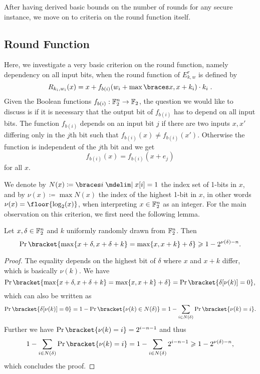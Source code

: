 After having derived basic bounds on the number of rounds for any secure instance, we move on to criteria on the round function itself.

\subsection{Round Function}
Here, we investigate a very basic criterion on the round function, namely dependency on all input bits, when the round function of $E^r_{k,w}$ is defined by
\begin{equation*}
    R_{k_i,w_i}(x) = x + f_{b(i)}(w_i + \max\set{x, x + k_i}) \cdot k_i\;.
\end{equation*}
Given the Boolean functions $f_{b(i)}:\mathbb{F}_2^n \to \mathbb{F}_2$, the question we would like to discuss is if it is necessary that the output bit of $f_{b(i)}$ has to depend on all input bits.
The function $f_{b(i)}$ depends on an input bit $j$ if there are two inputs $x,x'$ differing only in the $j$th bit such that $f_{b(i)}(x)\ne f_{b(i)}(x')$.
Otherwise the function is independent of the $j$th bit and we get
\begin{equation*}
    f_{b(i)}(x) = f_{b(i)}(x+e_j)
\end{equation*}
for all $x$.

We denote by $N(x) \coloneqq \set{i \given x[i] = 1}$ the index set of 1-bits in $x$, and by $\nu(x) \coloneqq \max N(x)$ the index of the highest 1-bit in $x$, in other words $\nu(x) = \floor{\log_2(x)}$, when interpreting $x \in \mathbb{F}_2^n$ as an integer.
For the main observation on this criterion, we first need the following lemma.
\begin{lemma}
\label{bison:lem:max_diff}
    Let $x, \delta \in \mathbb{F}_2^n$ and $k$ uniformly randomly drawn from $\mathbb{F}_2^n$.
    Then
    \begin{equation*}
        \Pr\bracket{\max\{x+\delta,x+\delta+k\}=\max\{x,x+k\}+\delta} \geqslant 1-2^{\nu(\delta)-n}.
    \end{equation*}
\end{lemma}
\begin{proof}
    The equality depends on the highest bit of $\delta$ where $x$ and $x + k$ differ, which is basically $\nu(k)$.
    We have
    \begin{equation*}
        \Pr\bracket{\max\{x+\delta,x+\delta+k\}=\max\{x,x+k\}+\delta} = \Pr\bracket{\delta[\nu(k)] = 0},
    \end{equation*}
    which can also be written as
    \begin{equation*}
        \Pr\bracket{\delta[\nu(k)] = 0}
        = 1 - \Pr\bracket{\nu(k) \in N(\delta)}
        = 1 - \sum_{i \in N(\delta)} \Pr\bracket{\nu(k) = i}.
    \end{equation*}
    Further we have $\Pr\bracket{\nu(k) = i} = 2^{i-n-1}$ and thus
    \begin{equation*}
        1 - \sum_{i \in N(\delta)} \Pr\bracket{\nu(k) = i} = 1 - \sum_{i \in N(\delta)} 2^{i - n - 1} \geqslant 1 - 2^{\nu(\delta) - n},
    \end{equation*}
    which concludes the proof.
\end{proof}

